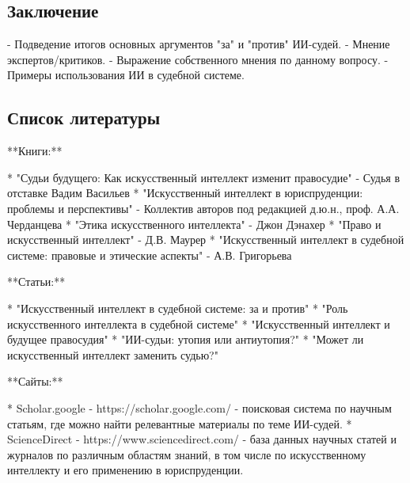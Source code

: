 \documentclass{article}
\begin{document}
\subsection{Заключение}

- Подведение итогов основных аргументов "за" и "против" ИИ-судей.
- Мнение экспертов/критиков.
- Выражение собственного мнения по данному вопросу.
- Примеры использования ИИ в судебной системе.

\subsection{Список литературы}

**Книги:**

* "Судьи будущего: Как искусственный интеллект изменит правосудие" - Судья в отставке Вадим Васильев
* "Искусственный интеллект в юриспруденции: проблемы и перспективы" - Коллектив авторов под редакцией д.ю.н., проф. А.А. Черданцева
* "Этика искусственного интеллекта" - Джон Дэнахер
* "Право и искусственный интеллект" - Д.В. Маурер
* "Искусственный интеллект в судебной системе: правовые и этические аспекты" - А.В. Григорьева

**Статьи:**

* "Искусственный интеллект в судебной системе: за и против"
* "Роль искусственного интеллекта в судебной системе"
* "Искусственный интеллект и будущее правосудия"
* "ИИ-судьи: утопия или антиутопия?"
* "Может ли искусственный интеллект заменить судью?"

**Сайты:**

* Scholar.google - https://scholar.google.com/ - поисковая система по научным статьям, где можно найти релевантные материалы по теме ИИ-судей.
* ScienceDirect - https://www.sciencedirect.com/ - база данных научных статей и журналов по различным областям знаний, в том числе по искусственному интеллекту и его применению в юриспруденции.
\end{document}
